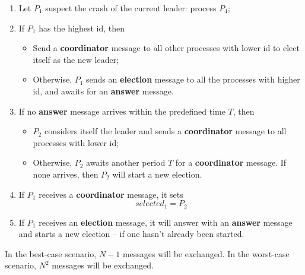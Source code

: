 \documentclass{article}
\begin{document}
\begin{enumerate}
	\item Let $P_1$ suspect the crash of the current leader: process $P_4$;
	\item If $P_1$ has the highest id, then
	\begin{itemize}
		\item Send a \textbf{coordinator} message to all other processes with lower id  to elect itself as the new leader;
		\item Otherwise, $P_1$ sends an \textbf{election} message to all the processes with higher id, and awaits for an \textbf{answer} message.
	\end{itemize}
	\item If no \textbf{answer} message arrives within the predefined time $T$, then
	\begin{itemize}
		\item $P_2$ considers itself the leader and sends a \textbf{coordinator} message to all processes with lower id;
		\item Otherwise, $P_2$ awaits another period $T$ for a \textbf{coordinator} message. If none arrives, then $P_2$ will start a new election.
	\end{itemize}
	\item If $P_1$ receives a \textbf{coordinator} message, it sets
	\[ selected_1 = P_2 \]
	\item If $P_1$ receives an \textbf{election} message, it will answer with an \textbf{answer} message and starts a new election -- if one hasn't already been started.
\end{enumerate}
In the best-case scenario, $N-1$ messages will be exchanged. In the worst-case scenario, $N^2$ messages will be exchanged.
\end{document}
